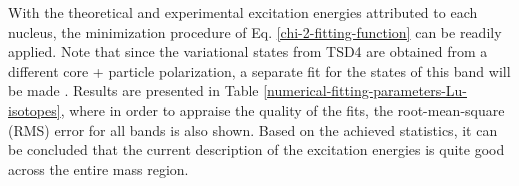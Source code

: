 With the theoretical and experimental excitation energies attributed to each nucleus, the minimization procedure of Eq. \ref{chi-2-fitting-function} can be readily applied. Note that since the variational states from TSD4 are obtained from a different core + particle polarization, a separate fit for the states of this band will be made \cite{raduta2020towards}. Results are presented in Table \ref{numerical-fitting-parameters-Lu-isotopes}, where in order to appraise the quality of the fits, the root-mean-square (RMS) error \cite{kenney1939mathematics} for all bands is also shown. Based on the achieved statistics, it can be concluded that the current description of the excitation energies is quite good across the entire mass region.
\begin{table}
    \centering
    \caption{The fitting parameters $\mathcal{P}_\text{fit}$, i.e., the moments of inertia, the single-particle potential strength, and the triaxiality $\gamma$ for each Lu isotope. The number of wobbling states and the root-mean-square error are also given in the last two columns.}
    \label{numerical-fitting-parameters-Lu-isotopes}
\end{table}

